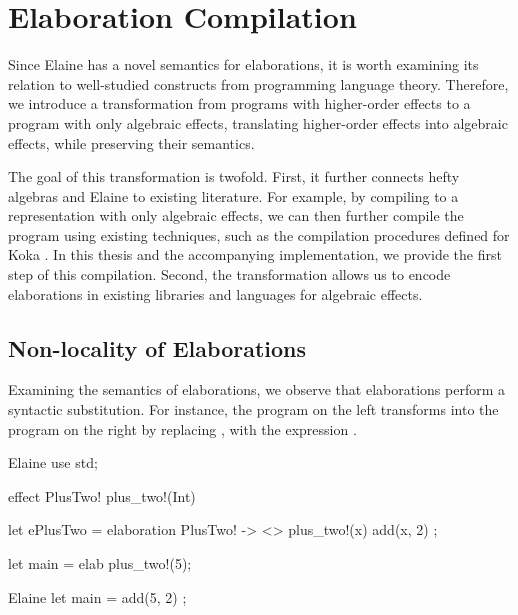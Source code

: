 \chapter{Elaboration Compilation}\label{chap:elabcomp}

Since Elaine has a novel semantics for elaborations, it is worth examining its relation to well-studied constructs from programming language theory. Therefore, we introduce a transformation from programs with higher-order effects to a program with only algebraic effects, translating higher-order effects into algebraic effects, while preserving their semantics.

The goal of this transformation is twofold. First, it further connects hefty algebras and Elaine to existing literature. For example, by compiling to a representation with only algebraic effects, we can then further compile the program using existing techniques, such as the compilation procedures defined for Koka \autocite{leijen_type_2017}. In this thesis and the accompanying implementation, we provide the first step of this compilation. Second, the transformation allows us to encode elaborations in existing libraries and languages for algebraic effects.

\section{Non-locality of Elaborations}


Examining the semantics of elaborations, we observe that elaborations perform a syntactic substitution. For instance, the program on the left transforms into the program on the right by replacing , with the expression .

\begin{minipage}[b]{0.5\textwidth}
\begin{lst}{Elaine}
use std;

effect PlusTwo! {
    plus_two!(Int)
}

let ePlusTwo = {
    elaboration PlusTwo! -> <> {
        plus_two!(x) { add(x, 2) }
    }
};

let main = elab plus_two!(5);
\end{lst}
\end{minipage}
\begin{minipage}[b]{0.5\textwidth}
\begin{lst}{Elaine}
let main = { add(5, 2) };
\end{lst}
\end{minipage}

